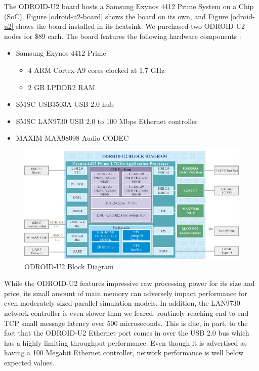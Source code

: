 \documentclass[11pt]{book}
\begin{document}
The ODROID-U2 board hosts a Samsung Exynos 4412 Prime System on a Chip (SoC).  Figure
\ref{odroid-u2-board} shows the board on its own, and Figure \ref{odroid-u2} shows the
board installed in its heatsink.  We purchased two ODROID-U2 nodes for \$89 each.  The
board features the following hardware components \cite{odroid-u2-board-detail}:

\begin{itemize}
\item Samsung Exynos 4412 Prime
  \begin{itemize}
  \item 4 ARM Cortex-A9 cores clocked at 1.7 GHz
  \item 2 GB LPDDR2 RAM
  \end{itemize}
\item SMSC USB3503A USB 2.0 hub
\item SMSC LAN9730 USB 2.0 to 100 Mbps Ethernet controller
\item MAXIM MAX98098 Audio CODEC
\end{itemize}

\begin{figure}
\centering
\includegraphics[width=\textwidth]{odroid_u2_block_diagram}
\caption{ODROID-U2 Block Diagram \cite{odroid-u2-board-detail}}
\label{odroid-u2-block-diagram}
\end{figure}

While the ODROID-U2 features impressive raw processing power for its size and price, its
small amount of main memory can adversely impact performance for even moderately sized
parallel simulation models.  In addition, the LAN9730 network controller is even slower
than we feared, routinely reaching end-to-end TCP small message latency over 500
microseconds.  This is due, in part, to the fact that the ODROID-U2 Ethernet port comes in
over the USB 2.0 bus which has a highly limiting throughput performance.  Even though it
is advertised as having a 100 Megabit Ethernet controller, network performance is well
below expected values.
\end{document}
